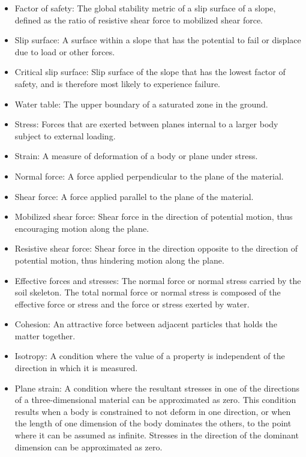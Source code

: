 \documentclass[12pt]{article}
\begin{document}
\begin{itemize}
\item{Factor of safety: The global stability metric of a slip surface of a slope, defined as the ratio of resistive shear force to mobilized shear force.}
\item{Slip surface: A surface within a slope that has the potential to fail or displace due to load or other forces.}
\item{Critical slip surface: Slip surface of the slope that has the lowest factor of safety, and is therefore most likely to experience failure.}
\item{Water table: The upper boundary of a saturated zone in the ground.}
\item{Stress: Forces that are exerted between planes internal to a larger body subject to external loading.}
\item{Strain: A measure of deformation of a body or plane under stress.}
\item{Normal force: A force applied perpendicular to the plane of the material.}
\item{Shear force: A force applied parallel to the plane of the material.}
\item{Mobilized shear force: Shear force in the direction of potential motion, thus encouraging motion along the plane.}
\item{Resistive shear force: Shear force in the direction opposite to the direction of potential motion, thus hindering motion along the plane.}
\item{Effective forces and stresses: The normal force or normal stress carried by the soil skeleton. The total normal force or normal stress is composed of the effective force or stress and the force or stress exerted by water.}
\item{Cohesion: An attractive force between adjacent particles that holds the matter together.}
\item{Isotropy: A condition where the value of a property is independent of the direction in which it is measured.}
\item{Plane strain: A condition where the resultant stresses in one of the directions of a  three-dimensional material can be approximated as zero. This condition results when a body is constrained to not deform in one direction, or when the length of one dimension of the body dominates the others, to the point where it can be assumed as infinite. Stresses in the direction of the dominant dimension can be approximated as zero.}
\end{itemize}
\end{document}
